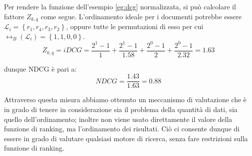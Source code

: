 \begin{esempio}\label{eg:ndcg}
	 Per rendere la funzione dell'esempio \ref{eg:dcg}  normalizzata, si può calcolare
	 il fattore $Z_{k,q}$ come segue.
	 L'ordinamento ideale per i documenti potrebbe essere $\mathcal{L}_i = \left\{r_1, r_4, r_3, r_2\right\}$,
	 oppure tutte le permutazioni di esso per cui $\rel_B(\mathcal{L}_i)= \left\{1,1,0,0\right\}$.
	 $$
	 Z_{k,q} = iDCG = \frac{2^{1} - 1}{1} + \frac{2^{1} - 1}{1.58} + \frac{2^{0} - 1}{2} + \frac{2^{0} - 1}{2.32} = 1.63
	 $$
	 
	 dunque NDCG è pari a:
	 $$
	 NDCG = \frac{1.43}{1.63} = 0.88
	 $$
\end{esempio}

Attraverso questa misura abbiamo ottenuto un meccanismo di valutazione che è in grado di tenere in considerazione
sia il problema della quantità di dati, sia quello dell'ordinamento; inoltre  non viene
usato direttamente il valore della funzione di ranking, ma l'ordinamento dei risultati.
Ciò ci consente dunque di essere in grado di valutare qualsiasi motore di ricerca,
senza fare restrizioni sulla funzione di ranking.
